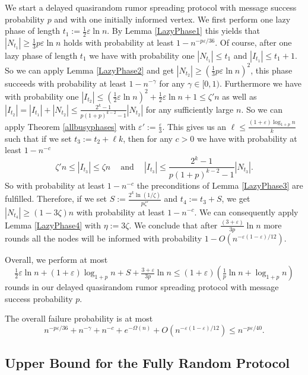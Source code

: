 \documentclass[12pt]{article}
\newcommand{\e}{\varepsilon}
\begin{document}
{We start a delayed quasirandom rumor spreading protocol with message success probability $p$ and with one initially informed vertex. We first perform one lazy phase of length $t_1:= \frac{1}{2}\e\ln n$. By Lemma \ref{LazyPhase1} this yields that
$|N_{t_1}| \geq \frac{1}{3}p\e\ln n$ holds with probability at least $1-n^{-p\e/36}$. 
Of course, after one lazy phase of length $t_1$ we have with probability one $|N_{t_1}| \leq t_1$ and $|I_{t_1}| \leq t_1 + 1$. So we can apply Lemma \ref{LazyPhase2} and get $|N_{t_2}| \geq \left(\frac{1}{3}p\e\ln n\right)^2$, this phase succeeds with probability at least $1-n^{-\gamma}$ for any $\gamma \in [0, 1)$. 
Furthermore we have with probability one
$|I_{t_2}| \leq \left(\frac{1}{2}\e\ln n\right)^2 + \frac{1}{2}\e\ln n + 1 \leq \zeta' n$
as well as $|I_{t_2}| = |I_{t_1}| + |N_{t_2}| \leq \frac{2^k-1}{p(1+p)^{k-2}-1}|N_{t_2}|$ for any sufficiently large $n$. 
So we can apply Theorem \ref{allbusyphases} with $\e' := \frac{\e}{3}$. This gives us an $\ell \leq \frac{(1+\e)\log_{1+p}n}{k}$ such that if we set $t_3:= t_2 + \ell k$, then for any $c >0$ we have with probability at least $1-n^{-c}$ 
$$\zeta' n \leq |I_{t_3}| \leq \zeta n \ \ \ \ \mbox{   and    }\ \ \ \ |I_{t_3}| \leq \frac{2^k-1}{p(1+p)^{k-2}-1}|N_{t_3}|.$$
So with probability at least $1-n^{-c}$ the preconditions of Lemma \ref{LazyPhase3} are fulfilled. Therefore, if we set $S:=\frac{2^k\ln(1/\zeta)}{p\zeta'}$ and $t_4 := t_3 + S$, we get
$|N_{t_4}| \geq \left(1-3\zeta\right)n$ with probability at least $1-n^{-c}$.
We can consequently apply Lemma \ref{LazyPhase4} with $\eta := 3\zeta$. We conclude that after $\frac{(3+\e)}{3p}\ln n$ more rounds all the nodes will be informed with probability  $1-O(n^{-\e(1-\e)/12})$.

Overall, we perform at most
\begin{equation*}
\tfrac{1}{2}\e\ln n+(1+\e)\log_{1+p} n+ S+\tfrac{3+\e}{3p}\ln n\leq (1+\e)\left(\tfrac{1}{p}\ln n+\log_{1+p} n\right)
\end{equation*}
rounds in our delayed quasirandom rumor spreading protocol with message success probability $p$.

The overall failure probability is at most
$$n^{-p\e/36} + n^{-\gamma} + n^{-c} + e^{-\Omega(n)} + O(n^{-\e(1-\e)/12}) \leq n^{-p\e/40}.$$


\subsection{Upper Bound for the Fully Random Protocol}

}
\end{document}

